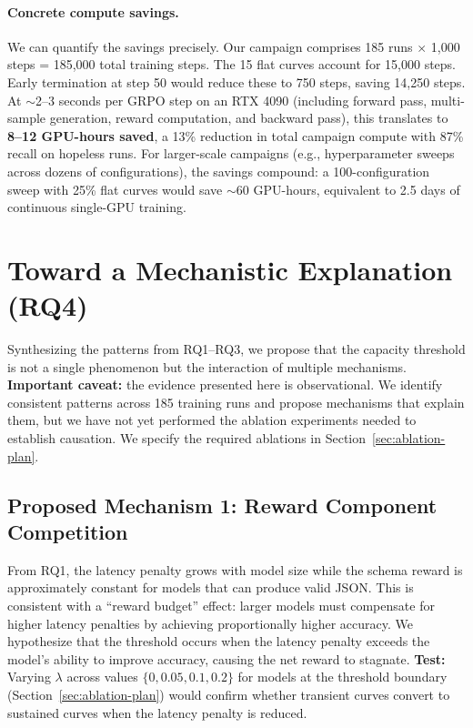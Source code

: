\documentclass[11pt]{article}
\begin{document}
\paragraph{Concrete compute savings.}
We can quantify the savings precisely.  Our campaign comprises 185 runs $\times$ 1{,}000 steps = 185{,}000 total training steps.  The 15 flat curves account for 15{,}000 steps.  Early termination at step 50 would reduce these to 750 steps, saving 14{,}250 steps.  At $\sim$2--3 seconds per GRPO step on an RTX 4090 (including forward pass, multi-sample generation, reward computation, and backward pass), this translates to \textbf{8--12 GPU-hours saved}, a 13\% reduction in total campaign compute with 87\% recall on hopeless runs.  For larger-scale campaigns (e.g., hyperparameter sweeps across dozens of configurations), the savings compound: a 100-configuration sweep with 25\% flat curves would save $\sim$60 GPU-hours, equivalent to 2.5 days of continuous single-GPU training.

\section{Toward a Mechanistic Explanation (RQ4)}
\label{sec:mechanism}

Synthesizing the patterns from RQ1--RQ3, we propose that the capacity threshold is not a single phenomenon but the interaction of multiple mechanisms.  \textbf{Important caveat:} the evidence presented here is observational.  We identify consistent patterns across 185 training runs and propose mechanisms that explain them, but we have not yet performed the ablation experiments needed to establish causation.  We specify the required ablations in Section~\ref{sec:ablation-plan}.

\subsection{Proposed Mechanism 1: Reward Component Competition}

From RQ1, the latency penalty grows with model size while the schema reward is approximately constant for models that can produce valid JSON.  This is consistent with a ``reward budget'' effect: larger models must compensate for higher latency penalties by achieving proportionally higher accuracy.  We hypothesize that the threshold occurs when the latency penalty exceeds the model's ability to improve accuracy, causing the net reward to stagnate.  \textbf{Test:} Varying $\lambda$ across values $\{0, 0.05, 0.1, 0.2\}$ for models at the threshold boundary (Section~\ref{sec:ablation-plan}) would confirm whether transient curves convert to sustained curves when the latency penalty is reduced.
\end{document}
